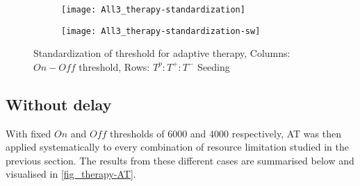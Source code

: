 \begin{figure}[h!]
  \centering
  \begin{subfigure}[b]{\textwidth}
    \centering
    \texttt{[image: All3\_therapy-standardization]}
  \end{subfigure}
  \begin{subfigure}[b]{\textwidth}
    \centering
    \texttt{[image: All3\_therapy-standardization-sw]}
  \end{subfigure}
  \caption[Standardization of threshold for adaptive therapy]{Standardization of threshold for adaptive therapy, Columns: $On-Off$ threshold, Rows: $T^p:T^+:T^-$ Seeding}
  \label{fig_therapy-AT_standardization}
\end{figure}

\subsection{Without delay}
With fixed $On$ and $Off$ thresholds of 6000 and 4000 respectively, AT was then applied systematically to every combination of resource limitation studied in the previous section. The results from these different cases are summarised below and visualised in \autoref{fig_therapy-AT}.
